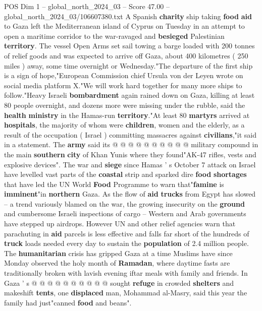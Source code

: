 \begin{textsample}{POS Dim 1 – global\_north\_2024\_03 – Score 47.00 – global\_north\_2024\_03/106607380.txt}  \label{ex:f1_pos_058}
A Spanish \textbf{charity} ship taking \textbf{food} \textbf{aid} to Gaza left the Mediterranean island of Cyprus on Tuesday in an attempt to open a maritime corridor to the war-ravaged and \textbf{besieged} Palestinian \textbf{territory}.
The vessel Open Arms set sail towing a barge loaded with 200 tonnes of relief goods and was expected to arrive off Gaza, about 400 kilometres ( 250 miles ) away, some time overnight or Wednesday."The departure of the first ship is a sign of hope,"European Commission chief Ursula von der Leyen wrote on social media platform X."We will work hard together for many more ships to follow."Heavy Israeli \textbf{bombardment} again rained down on Gaza, killing at least 80 people overnight, and dozens more were missing under the rubble, said the \textbf{health} \textbf{ministry} in the Hamas-run \textbf{territory}."At least 80 \textbf{martyrs} arrived at \textbf{hospitals}, the majority of whom were \textbf{children}, women and the elderly, as a result of the occupation ( Israel ) committing massacres against \textbf{civilians},"it said in a statement.
The \textbf{army} said its @ @ @ @ @ @ @ @ @ @ military compound in the main \textbf{southern} \textbf{city} of Khan Yunis where they found"AK-47 rifles, vests and explosive devices".
The war and \textbf{siege} since Hamas ' s October 7 attack on Israel have levelled vast parts of the \textbf{coastal} strip and sparked dire \textbf{food} \textbf{shortages} that have led the UN World \textbf{Food} Programme to warn that"\textbf{famine} is \textbf{imminent}"in \textbf{northern} Gaza.
As the flow of \textbf{aid} \textbf{trucks} from Egypt has slowed -- a trend variously blamed on the war, the growing insecurity on the \textbf{ground} and cumbersome Israeli inspections of cargo -- Western and Arab governments have stepped up airdrops.
However UN and other relief agencies warn that parachuting in \textbf{aid} parcels is less effective and falls far short of the hundreds of \textbf{truck} loads needed every day to sustain the \textbf{population} of 2.4 million people.
The \textbf{humanitarian} crisis has gripped Gaza at a time Muslims have since Monday observed the holy month of \textbf{Ramadan}, where daytime fasts are traditionally broken with lavish evening iftar meals with family and friends.
In Gaza ' s @ @ @ @ @ @ @ @ @ @ sought \textbf{refuge} in crowded \textbf{shelters} and makeshift \textbf{tents}, one \textbf{displaced} man, Mohammad al-Masry, said this year the family had just"canned \textbf{food} and beans".

\end{textsample}

